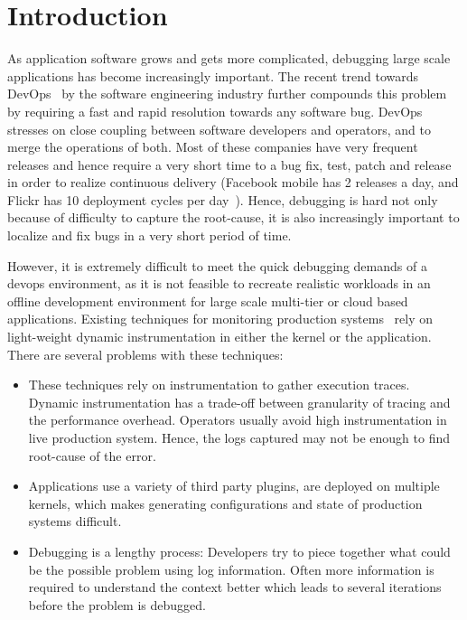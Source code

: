 
\section{Introduction}
\label{sec:intro}

As application software grows and gets more complicated, debugging large scale applications has become increasingly important. 
The recent trend towards DevOps~\cite{devops} by the software engineering industry further compounds this problem by requiring a fast and rapid resolution towards any software bug.
DevOps stresses on close coupling between software developers and operators, and to merge the operations of both. 
Most of these companies have very frequent releases and hence require a very short time to a bug fix, test, patch and release in order to realize continuous delivery (Facebook mobile has 2 releases a day, and Flickr has 10 deployment cycles per day~\cite{10DevOps}).
Hence, debugging is hard not only because of difficulty to capture the root-cause, it is also increasingly important to localize and fix bugs in a very short period of time.


\noindent
However, it is extremely difficult to meet the quick debugging demands of a devops environment, as it is not feasible to recreate realistic workloads in an offline development environment for large scale multi-tier or cloud based applications.
Existing techniques for monitoring production systems~\cite{dtrace, iProbe, winetw} rely on light-weight dynamic instrumentation in either the kernel or the application. 
There are several problems with these techniques:
\begin{itemize}[leftmargin=*,topsep=0pt,itemsep=-1ex,partopsep=1ex,parsep=1ex]
\item These techniques rely on instrumentation to gather execution traces.
Dynamic instrumentation has a trade-off between granularity of tracing and the performance overhead. 
Operators usually avoid high instrumentation in live production system.
Hence, the logs captured may not be enough to find root-cause of the error.
\item Applications use a variety of third party plugins, are deployed on multiple kernels, which makes generating configurations and state of production systems difficult. 
\item Debugging is a lengthy process: Developers try to piece together what could be the possible problem using log information.
Often more information is required to understand the context better which leads to several iterations before the problem is debugged.
\end{itemize}

